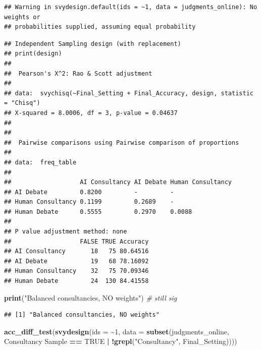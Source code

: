 \documentclass[
]{article}
\newenvironment{Shaded}{\begin{snugshade}}{\end{snugshade}}
\newcommand{\AttributeTok}[1]{\textcolor[rgb]{0.13,0.29,0.53}{#1}}
\newcommand{\CommentTok}[1]{\textcolor[rgb]{0.56,0.35,0.01}{\textit{#1}}}
\newcommand{\ConstantTok}[1]{\textcolor[rgb]{0.56,0.35,0.01}{#1}}
\newcommand{\DecValTok}[1]{\textcolor[rgb]{0.00,0.00,0.81}{#1}}
\newcommand{\FunctionTok}[1]{\textcolor[rgb]{0.13,0.29,0.53}{\textbf{#1}}}
\newcommand{\NormalTok}[1]{#1}
\newcommand{\SpecialCharTok}[1]{\textcolor[rgb]{0.81,0.36,0.00}{\textbf{#1}}}
\newcommand{\StringTok}[1]{\textcolor[rgb]{0.31,0.60,0.02}{#1}}
\begin{document}
\begin{verbatim}
## Warning in svydesign.default(ids = ~1, data = judgments_online): No weights or
## probabilities supplied, assuming equal probability
\end{verbatim}

\begin{verbatim}
## Independent Sampling design (with replacement)
## print(design)
## 
##  Pearson's X^2: Rao & Scott adjustment
## 
## data:  svychisq(~Final_Setting + Final_Accuracy, design, statistic = "Chisq")
## X-squared = 8.0006, df = 3, p-value = 0.04637
## 
## 
##  Pairwise comparisons using Pairwise comparison of proportions 
## 
## data:  freq_table 
## 
##                   AI Consultancy AI Debate Human Consultancy
## AI Debate         0.8200         -         -                
## Human Consultancy 0.1199         0.2689    -                
## Human Debate      0.5555         0.2970    0.0088           
## 
## P value adjustment method: none 
##                   FALSE TRUE Accuracy
## AI Consultancy       18   75 80.64516
## AI Debate            19   68 78.16092
## Human Consultancy    32   75 70.09346
## Human Debate         24  130 84.41558
\end{verbatim}

\begin{Shaded}
\begin{Highlighting}[]
\FunctionTok{print}\NormalTok{(}\StringTok{"Balanced consultancies, NO weights"}\NormalTok{) }\CommentTok{\# still sig}
\end{Highlighting}
\end{Shaded}

\begin{verbatim}
## [1] "Balanced consultancies, NO weights"
\end{verbatim}

\begin{Shaded}
\begin{Highlighting}[]
\FunctionTok{acc\_diff\_test}\NormalTok{(}\FunctionTok{svydesign}\NormalTok{(}\AttributeTok{ids =} \SpecialCharTok{\textasciitilde{}}\DecValTok{1}\NormalTok{, }\AttributeTok{data =} \FunctionTok{subset}\NormalTok{(judgments\_online, }\StringTok{\textasciigrave{}}\AttributeTok{Consultancy Sample}\StringTok{\textasciigrave{}} \SpecialCharTok{==} \ConstantTok{TRUE} \SpecialCharTok{|} \SpecialCharTok{!}\FunctionTok{grepl}\NormalTok{(}\StringTok{"Consultancy"}\NormalTok{, Final\_Setting))))}
\end{Highlighting}
\end{Shaded}
\end{document}
